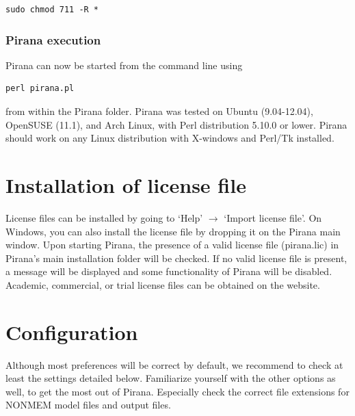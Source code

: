 \begin{lstlisting} 
sudo chmod 711 -R *
\end{lstlisting}

\subsubsection*{Pirana execution}
\noindent Pirana can now be started from the command line using

\begin{lstlisting}
perl pirana.pl
\end{lstlisting}

\noindent from within the Pirana folder. Pirana was tested on Ubuntu
(9.04-12.04), OpenSUSE (11.1), and Arch Linux, with Perl
distribution 5.10.0 or lower. Pirana should work on any Linux distribution
with X-windows and Perl/Tk installed.

\section{Installation of license file} License files can be installed by going to `Help' $\rightarrow$ `Import license file'. On Windows, you can also install the license file by dropping it on the Pirana main window. Upon starting Pirana, the presence of a valid license file (pirana.lic) in Pirana's main installation folder will be checked. If no valid license file is present, a message will be displayed and some functionality of Pirana will be
disabled. Academic, commercial, or trial license files can be obtained
on the website. 

\section{Configuration} Although most preferences will
be correct by default, we recommend to check at least the
settings detailed below. Familiarize yourself with
the other options as well, to get the most out of Pirana. Especially check the correct file extensions
for NONMEM model files and output files.

